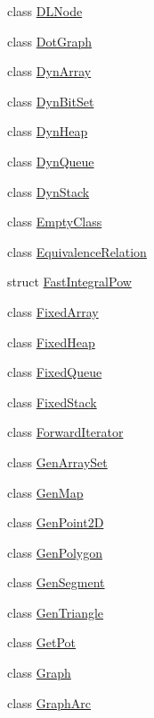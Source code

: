 \begin{DoxyCompactItemize}
\item 
class \hyperlink{class_designar_1_1_d_l_node}{D\+L\+Node}
\item 
class \hyperlink{class_designar_1_1_dot_graph}{Dot\+Graph}
\item 
class \hyperlink{class_designar_1_1_dyn_array}{Dyn\+Array}
\item 
class \hyperlink{class_designar_1_1_dyn_bit_set}{Dyn\+Bit\+Set}
\item 
class \hyperlink{class_designar_1_1_dyn_heap}{Dyn\+Heap}
\item 
class \hyperlink{class_designar_1_1_dyn_queue}{Dyn\+Queue}
\item 
class \hyperlink{class_designar_1_1_dyn_stack}{Dyn\+Stack}
\item 
class \hyperlink{class_designar_1_1_empty_class}{Empty\+Class}
\item 
class \hyperlink{class_designar_1_1_equivalence_relation}{Equivalence\+Relation}
\item 
struct \hyperlink{struct_designar_1_1_fast_integral_pow}{Fast\+Integral\+Pow}
\item 
class \hyperlink{class_designar_1_1_fixed_array}{Fixed\+Array}
\item 
class \hyperlink{class_designar_1_1_fixed_heap}{Fixed\+Heap}
\item 
class \hyperlink{class_designar_1_1_fixed_queue}{Fixed\+Queue}
\item 
class \hyperlink{class_designar_1_1_fixed_stack}{Fixed\+Stack}
\item 
class \hyperlink{class_designar_1_1_forward_iterator}{Forward\+Iterator}
\item 
class \hyperlink{class_designar_1_1_gen_array_set}{Gen\+Array\+Set}
\item 
class \hyperlink{class_designar_1_1_gen_map}{Gen\+Map}
\item 
class \hyperlink{class_designar_1_1_gen_point2_d}{Gen\+Point2D}
\item 
class \hyperlink{class_designar_1_1_gen_polygon}{Gen\+Polygon}
\item 
class \hyperlink{class_designar_1_1_gen_segment}{Gen\+Segment}
\item 
class \hyperlink{class_designar_1_1_gen_triangle}{Gen\+Triangle}
\item 
class \hyperlink{class_designar_1_1_get_pot}{Get\+Pot}
\item 
class \hyperlink{class_designar_1_1_graph}{Graph}
\item 
class \hyperlink{class_designar_1_1_graph_arc}{Graph\+Arc}

\end{DoxyCompactItemize}
